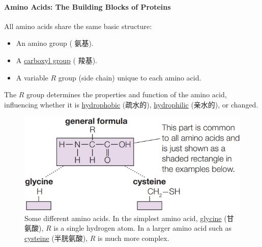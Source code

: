 \paragraph{Amino Acids: The Building Blocks of Proteins}
All amino acids share the same basic structure:
\begin{itemize}
    \item An amino group ( 氨基).
    \item A \underline{carboxyl group} ( 羧基).
    \item A variable $R$ group (side chain) unique to each amino acid.
\end{itemize}
The $R$ group determines the properties and function of the amino acid, influencing whether it is \underline{hydrophobic} (疏水的),
\underline{hydrophilic} (亲水的), or changed.
\begin{figure}[H]
    \centering
    \includegraphics[scale=0.35]{Biology/1A/Images/1A-5-1.png}
    \caption{Some different amino acids. In the simplest amino acid, \underline{glycine} (甘氨酸), $R$ is a single hydrogen atom.
    In a larger amino acid such as \underline{cysteine} (半胱氨酸), $R$ is much more complex.}
\end{figure}

